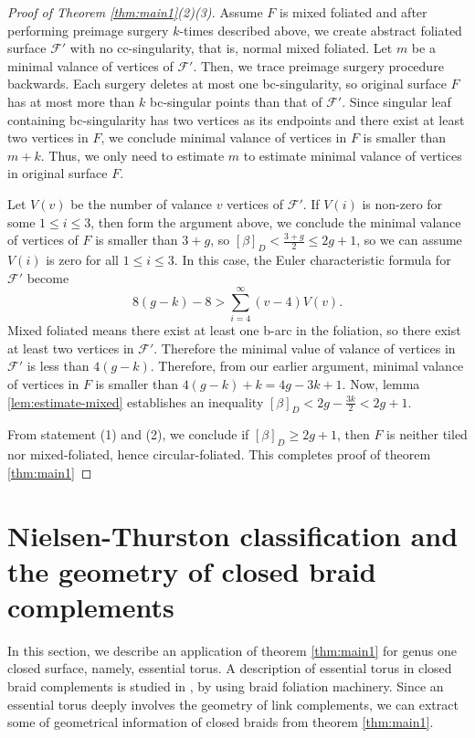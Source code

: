 \documentclass[12pt]{amsart}
\begin{document}
\begin{proof}[Proof of Theorem \ref{thm:main1}(2)(3)]
    Assume $F$ is mixed foliated and after performing preimage surgery $k$-times described above, we create abstract foliated surface $\mathcal{F}'$ with no cc-singularity, that is, normal mixed foliated. 
Let $m$ be a minimal valance of vertices of $\mathcal{F}'$. Then, we trace preimage surgery procedure backwards. Each surgery deletes at most one bc-singularity, so original surface $F$ has at most more than $k$ bc-singular points than that of $\mathcal{F}'$. Since singular leaf containing bc-singularity has two vertices as its endpoints and there exist at least two vertices in $F$, we conclude minimal valance of vertices in $F$ is smaller than $m+k$. Thus, we only need to estimate $m$ to estimate minimal valance of vertices in original surface $F$.

   Let $V(v)$ be the number of valance $v$ vertices of $\mathcal{F}'$. If $V(i)$ is non-zero for some $1 \leq i \leq 3$, then form the argument above, we conclude the minimal valance of vertices of $F$ is smaller than $3+g$, so $[\beta]_{D} < \frac{3+g}{2} \leq 2g+1$, so we can assume $V(i)$ is zero for all $1 \leq i \leq 3$.
  In this case, the Euler characteristic formula for $\mathcal{F}'$ become 
  \[8(g-k)-8 > \sum_{i=4}^{\infty}(v-4)V(v).\]
     Mixed foliated means there exist at least one b-arc in the foliation, so there exist at least two vertices in $\mathcal{F}'$. Therefore the minimal value of valance of vertices in $\mathcal{F}'$ is less than $4(g-k)$. Therefore, from our earlier argument, minimal valance of vertices in $F$ is smaller than $4(g-k)+k = 4g-3k+1$. Now, lemma \ref{lem:estimate-mixed} establishes an inequality $[\beta]_{D}< 2g-\frac{3k}{2}< 2g+1$.
     
 From statement (1) and (2), we conclude if $[\beta]_{D} \geq 2g+1$, then $F$ is neither tiled nor mixed-foliated, hence circular-foliated. This completes proof of theorem \ref{thm:main1}
\end{proof}

 

\section{Nielsen-Thurston classification and the geometry of closed braid complements}

   In this section, we describe an application of theorem \ref{thm:main1} for genus one closed surface, namely, essential torus. A description of essential torus in closed braid complements is studied in \cite{bm2},\cite{n} by using braid foliation machinery. 
Since an essential torus deeply involves the geometry of link complements, we can extract some of geometrical information of closed braids from theorem \ref{thm:main1}.
\end{document}
